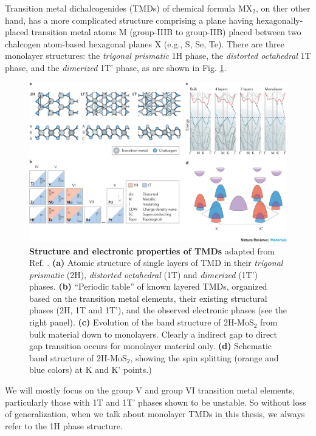 Transition metal dichalcogenides (TMDs) of chemical formula MX$_2$, on ther other hand, has a more complicated structure comprising a plane having hexagonally-placed transition metal atoms M (group-IIIB to group-IIB) placed between two chalcogen atom-based hexagonal planes X (e.g., S, Se, Te). There are three monolayer structures: the \emph{trigonal prismatic} 1H phase, the \emph{distorted octahedral} 1T phase, and the \emph{dimerized} 1T' phase, as are shown in Fig. \ref{fig:TMD_electonic_properties}.
\begin{figure}[!htp]
    \centering
    \includegraphics[width=1.0\textwidth]{figures/Background/TMD.png}
    \caption{\textbf{Structure and electronic properties of TMDs} adapted from Ref. \cite{manzeli20172d}. \textbf{(a)} Atomic structure of single layers of TMD in their \emph{trigonal prismatic} (2H), \emph{distorted octahedral} (1T) and \emph{dimerized} (1T') phases. \textbf{(b)} ``Periodic table'' of known layered TMDs, organized based on the transition metal elements, their existing structural phases (2H, 1T and 1T'), and the observed electronic phases (see the right panel). \textbf{(c)} Evolution of the band structure of 2H-MoS$_2$ from bulk material down to monolayers. Clearly a indirect gap to direct gap transition occurs for monolayer material only. \textbf{(d)} Schematic band structure of 2H-MoS$_2$, showing the spin splitting (orange and blue colors) at K and K' points.)}
    \label{fig:TMD_electonic_properties}
\end{figure}
We will mostly focus on the group V and group VI transition metal elements, particularly those with 1T and 1T' phases shown to be unstable. So without loss of generalization, when we talk about monolayer TMDs in this thesis, we always refer to the 1H phase structure.

